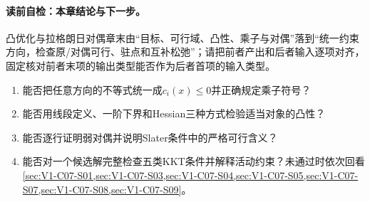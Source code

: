 \begin{SLChapterExercisePairSection}
\end{SLChapterExercisePairSection}

\label{struct:V1-C07-CH36}

\paragraph{读前自检：本章结论与下一步。}凸优化与拉格朗日对偶章末由“目标、可行域、凸性、乘子与对偶”落到“统一约束方向，检查原/对偶可行、驻点和互补松弛”；请把前者产出和后者输入逐项对齐，固定核对前者末项的输出类型能否作为后者首项的输入类型。\par

\begin{SLCompactClosure}

\label{struct:V1-C07-CH37}
\begin{selfcheckbox}
\begin{enumerate}[leftmargin=2.2em]
  \item 能否把任意方向的不等式统一成$c_i(x)\le0$并正确规定乘子符号？
  \item 能否用线段定义、一阶下界和Hessian三种方式检验适当对象的凸性？
  \item 能否逐行证明弱对偶并说明Slater条件中的严格可行含义？
  \item 能否对一个候选解完整检查五类KKT条件并解释活动约束？未通过时依次回看\cref{sec:V1-C07-S01,sec:V1-C07-S03,sec:V1-C07-S04,sec:V1-C07-S05,sec:V1-C07-S07,sec:V1-C07-S08,sec:V1-C07-S09}。
\end{enumerate}
\end{selfcheckbox}
\end{SLCompactClosure}
